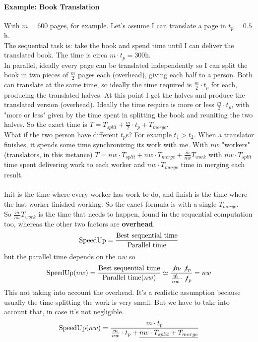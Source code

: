 \documentclass[10pt]{report}
\begin{document}
\paragraph{Example: Book Translation} With $m=600$ pages, for example. Let's assume I can translate a page in $t_p = 0.5$h.\\
The sequential task is: take the book and spend time until I can deliver the translated book. The time is circa $m\cdot t_p = 300$h.\\
In parallel, ideally every page can be translated independently so I can split the book in two pieces of $\frac{m}{2}$ pages each (overhead), giving each half to a person. Both can translate at the same time, so ideally the time required is $\frac{m}{2}\cdot t_p$ for each, producing the translated halves. At this point I get the halves and produce the translated version (overhead). Ideally the time require is more or less $\frac{m}{2}\cdot t_p$, with "more or less" given by the time spent in splitting the book and reuniting the two halves. So the exact time is $T = T_{split} + \frac{m}{2} \cdot t_p + T_{merge}$.\\
What if the two person have different $t_p$s? For example $t_1 > t_2$. When a translator finishes, it spends some time synchronizing its work with me. With $nw$ "workers" (translators, in this instance) $T = nw\cdot T_{split} + nw\cdot T_{merge} + \frac{m}{nw}T_{work}$ with $nw\cdot T_{split}$ time spent delivering work to each worker and $nw\cdot T_{merge}$ time in merging each result.\\\\
Init is the time where every worker has work to do, and finish is the time where the last worker finished working. So the exact formula is with a single $T_{merge}$.\\
So $\frac{m}{nw}T_{work}$ is the time that needs to happen, found in the sequential computation too, whereas the other two factors are \textbf{overhead}.
$$\hbox{SpeedUp} = \frac{\hbox{Best sequential time}}{\hbox{Parallel time}}$$ but the parallel time depends on the $nw$ so $$\hbox{SpeedUp}(nw) = \frac{\hbox{Best sequential time}}{\hbox{Parallel time}(nw)} \simeq \frac{\not m\cdot \not t_p}{\frac{\not m}{nw}\cdot \not t_p} = nw$$ This not taking into account the overhead. It's a realistic assumption because usually the time splitting the work is very small. But we have to take into account that, in case it's not negligible. $$\hbox{SpeedUp}(nw) = \frac{m\cdot t_p}{\frac{m}{nw}\cdot t_p + \underline{nw\cdot T_{split} + T_{merge}}}$$
\end{document}
